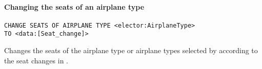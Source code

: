 %

\paragraph{Changing the seats of an airplane type}
\begin{operation}
  \label{op:change_seats}
  \begin{lstlisting}
CHANGE SEATS OF AIRPLANE TYPE <elector:AirplaneType>
TO <data:[Seat_change]>
  \end{lstlisting}
  \label{op:change_seats_of}
\end{operation}
Changes the seats of the airplane type or airplane types selected by
 according to the seat changes in .

